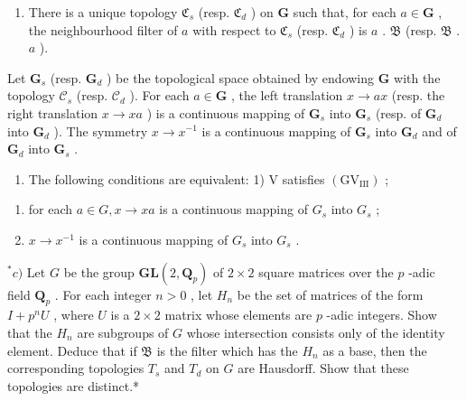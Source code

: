 \begin{enumerate}
\def\labelenumi{\alph{enumi})}
\tightlist
\item
  There is a unique topology \(\mathfrak{C}_s\) (resp. \(\mathfrak{C}_d\) ) on \(\mathbf{G}\) such that, for each \(a \in \mathbf{G}\) , the neighbourhood filter of \(a\) with respect to \(\mathfrak{C}_s\) (resp. \(\mathfrak{C}_d\) ) is \(a\) . \(\mathfrak{B}\) (resp. \(\mathfrak{B}\) . \(a\) ).
\end{enumerate}

Let \(\mathbf{G}_s\) (resp. \(\mathbf{G}_d\) ) be the topological space obtained by endowing \(\mathbf{G}\) with the topology \(\mathcal{C}_s\) (resp. \(\mathcal{C}_d\) ). For each \(a \in \mathbf{G}\) , the left translation \(x \to ax\) (resp. the right translation \(x \to xa\) ) is a continuous mapping of \(\mathbf{G}_s\) into \(\mathbf{G}_s\) (resp. of \(\mathbf{G}_d\) into \(\mathbf{G}_d\) ). The symmetry \(x \to x^{-1}\) is a continuous mapping of \(\mathbf{G}_s\) into \(\mathbf{G}_d\) and of \(\mathbf{G}_d\) into \(\mathbf{G}_s\) .

\begin{enumerate}
\def\labelenumi{\alph{enumi})}
\setcounter{enumi}{1}
\tightlist
\item
  The following conditions are equivalent: 1) V satisfies \((\mathrm{GV}_{\mathrm{III}})\) ;
\end{enumerate}

\begin{enumerate}
\def\labelenumi{\arabic{enumi})}
\setcounter{enumi}{1}
\tightlist
\item
  for each \(a \in G, x \to xa\) is a continuous mapping of \(G_{s}\) into \(G_{s}\) ;
\item
  \(x \to x^{-1}\) is a continuous mapping of \(G_{s}\) into \(G_{s}\) .
\end{enumerate}

\(^{*}c)\) Let \(G\) be the group \(\mathbf{GL}(2, \mathbf{Q}_p)\) of \(2 \times 2\) square matrices over the \(p\) -adic field \(\mathbf{Q}_p\) . For each integer \(n > 0\) , let \(H_n\) be the set of matrices of the form \(I + p^n U\) , where \(U\) is a \(2 \times 2\) matrix whose elements are \(p\) -adic integers. Show that the \(H_n\) are subgroups of \(G\) whose intersection consists only of the identity element. Deduce that if \(\mathfrak{B}\) is the filter which has the \(H_n\) as a base, then the corresponding topologies \(T_s\) and \(T_d\) on \(G\) are Hausdorff. Show that these topologies are distinct.*

